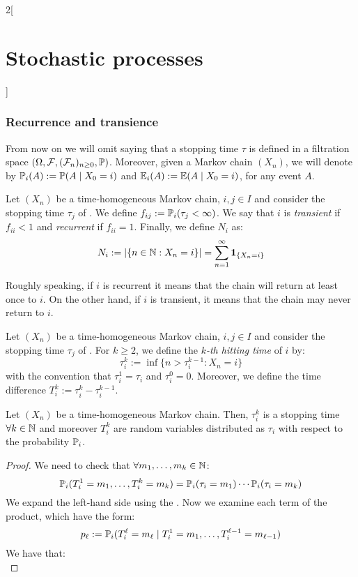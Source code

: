 \documentclass[../../../main_math.tex]{subfiles}
\begin{document}
\begin{multicols}{2}[\section{Stochastic processes}]
  \subsubsection{Recurrence and transience}
  From now on we will omit saying that a stopping time $\tau$ is defined in a filtration space $(\Omega,\mathcal{F},(\mathcal{F}_n)_{n\geq 0},\mathbb{P})$. Moreover, given a Markov chain $(X_n)$, we will denote by $\mathbb{P}_i(A):=\mathbb{P}(A\mid X_0=i)$ and $\mathbb{E}_i(A):=\mathbb{E}(A\mid X_0=i)$, for any event $A$.
  \begin{definition}
    Let $(X_n)$ be a time-homogeneous Markov chain, $i,j\in I$ and consider the stopping time $\tau_j$ of . We define $f_{ij}:=\mathbb{P}_i(\tau_j<\infty)$. We say that $i$ is \emph{transient} if $f_{ii}<1$ and \emph{recurrent} if $f_{ii}=1$. Finally, we define $N_i$ as:
    $$
      N_i:=\abs{\{n\in\mathbb{N}:X_n=i\}}=\sum_{n=1}^{\infty}\boldsymbol{\mathrm{1}}_{\{X_n=i\}}
    $$
  \end{definition}
  \begin{remark}
    Roughly speaking, if $i$ is recurrent it means that the chain will return at least once to $i$. On the other hand, if $i$ is transient, it means that the chain may never return to $i$.
  \end{remark}
  \begin{definition}
    Let $(X_n)$ be a time-homogeneous Markov chain, $i,j\in I$ and consider the stopping time $\tau_j$ of . For $k\geq 2$, we define the \emph{$k$-th hitting time} of $i$ by:
    $$
      \tau_i^k:= \inf\{n>\tau_i^{k-1}:X_n=i\}
    $$
    with the convention that $\tau_i^1=\tau_i$ and $\tau_i^0=0$. Moreover, we define the time difference $T_i^k:=\tau_i^k-\tau_i^{k-1}$.
  \end{definition}
  \begin{lemma}
    Let $(X_n)$ be a time-homogeneous Markov chain. Then, $\tau_i^k$ is a stopping time $\forall k\in\mathbb{N}$ and moreover $T_i^k$ are \iid random variables distributed as $\tau_i$ with respect to the probability $\mathbb{P}_i$.
  \end{lemma}
  \begin{proof}
    We need to check that $\forall m_1,\ldots,m_k\in\mathbb{N}$:
    $$
      \mathbb{P}_i(T_i^1=m_1,\ldots,T_i^k=m_k)=\mathbb{P}_i(\tau_i=m_1)\cdots\mathbb{P}_i(\tau_i=m_k)
    $$
    We expand the left-hand side using the . Now we examine each term of the product, which have the form:
    $$
      p_{\ell}:=\mathbb{P}_i(T_i^\ell=m_\ell\mid T_i^1=m_1,\ldots,T_i^{\ell-1}=m_{\ell-1})
    $$
    We have that:
    \begin{equation*}

\end{equation*}
\end{proof}
\end{multicols}
\end{document}
